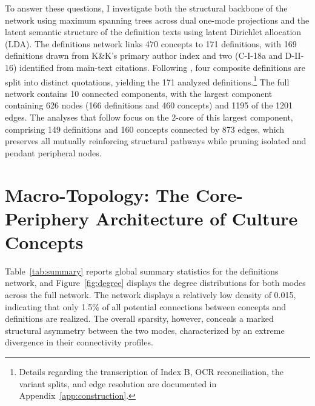 \documentclass[11pt]{article}
\begin{document}
To answer these questions, I investigate both the structural backbone of the network using maximum spanning trees across dual one-mode projections and the latent semantic structure of the definition texts using latent Dirichlet allocation (LDA). The definitions network links 470 concepts to 171 definitions, with 169 definitions drawn from K\&K's primary author index and two (C-I-18a and D-II-16) identified from main-text citations. Following \citet{boroch2016}, four composite definitions are split into distinct quotations, yielding the 171 analyzed definitions.\footnote{Details regarding the transcription of Index B, OCR reconciliation, the variant splits, and edge resolution are documented in Appendix~\ref{app:construction}.} The full network contains 10 connected components, with the largest component containing 626 nodes (166 definitions and 460 concepts) and 1195 of the 1201 edges. The analyses that follow focus on the 2-core of this largest component, comprising 149 definitions and 160 concepts connected by 873 edges, which preserves all mutually reinforcing structural pathways while pruning isolated and pendant peripheral nodes.

\section{Macro-Topology: The Core-Periphery Architecture of Culture Concepts}

Table~\ref{tab:summary} reports global summary statistics for the definitions network, and Figure~\ref{fig:degree} displays the degree distributions for both modes across the full network. The network displays a relatively low density of 0.015, indicating that only 1.5\% of all potential connections between concepts and definitions are realized. The overall sparsity, however, conceals a marked structural asymmetry between the two modes, characterized by an extreme divergence in their connectivity profiles.
\end{document}
